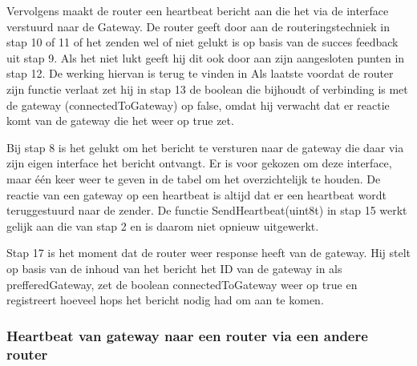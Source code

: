\documentclass[a4paper, 11pt, oneside]{report}
\begin{document}
Vervolgens maakt de router een heartbeat bericht aan die het via de  interface verstuurd naar de Gateway.
De router geeft door aan de routeringstechniek in stap 10 of 11 of het zenden wel of niet gelukt is op basis van de succes feedback uit stap 9.
Als het niet lukt geeft hij dit ook door aan zijn aangesloten punten in stap 12. 
De werking hiervan is terug te vinden in 
Als laatste voordat de router zijn functie verlaat zet hij in stap 13 de boolean die bijhoudt of verbinding is met de gateway (connectedToGateway) op false, omdat hij verwacht dat er reactie komt van de gateway die het weer op true zet.

Bij stap 8 is het gelukt om het bericht te versturen naar de gateway die daar via zijn eigen  interface het bericht ontvangt.
Er is voor gekozen om deze interface, maar één keer weer te geven in de tabel om het overzichtelijk te houden.
De reactie van een gateway op een heartbeat is altijd dat er een heartbeat wordt teruggestuurd naar de zender. 
De functie SendHeartbeat(uint8\textunderscore t) in stap 15 werkt gelijk aan die van stap 2 en is daarom niet opnieuw uitgewerkt.

Stap 17 is het moment dat de router weer response heeft van de gateway.
Hij stelt op basis van de inhoud van het bericht het ID van de gateway in als prefferedGateway, zet de boolean connectedToGateway weer op true en registreert hoeveel hops het bericht nodig had om aan te komen.

\subsubsection{Heartbeat van gateway naar een router via een andere router}
\label{DetailedDesign:Communicatie:sequence:heartbeatgateway->router->router}
\end{document}
